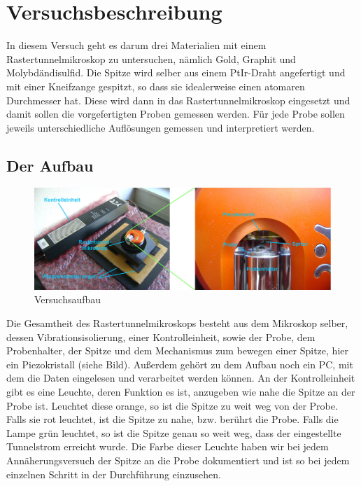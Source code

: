 \section{Versuchsbeschreibung}

In diesem Versuch geht es darum drei Materialien mit einem Rastertunnelmikroskop zu untersuchen, nämlich Gold, Graphit und Molybdändisulfid. Die Spitze wird selber aus einem PtIr-Draht angefertigt und mit einer Kneifzange gespitzt, so dass sie idealerweise einen atomaren Durchmesser hat. Diese wird dann in das Rastertunnelmikroskop eingesetzt und damit sollen die vorgefertigten Proben gemessen werden. Für  jede Probe sollen jeweils unterschiedliche Auflösungen gemessen und interpretiert werden.

\subsection{Der Aufbau}

\begin{figure}[H]
	\centering \includegraphics[width=\textwidth]{Bilder/aufbau.jpg}
	\caption{Versuchsaufbau}
\end{figure}

Die Gesamtheit des Rastertunnelmikroskops besteht aus dem Mikroskop selber, dessen Vibrationsisolierung, einer Kontrolleinheit, sowie der Probe, dem Probenhalter, der Spitze und dem Mechanismus zum bewegen einer Spitze, hier ein Piezokristall (siehe Bild). Außerdem gehört zu dem Aufbau noch ein PC, mit dem die Daten eingelesen und verarbeitet werden können. 
An der Kontrolleinheit gibt es eine Leuchte, deren Funktion es ist, anzugeben wie nahe die Spitze an der Probe ist. Leuchtet diese orange, so ist die Spitze zu weit weg von der Probe. Falls sie rot leuchtet, ist die Spitze zu nahe, bzw. berührt die Probe. Falls die Lampe grün leuchtet, so ist die Spitze genau so weit weg, dass der eingestellte Tunnelstrom erreicht wurde. Die Farbe dieser Leuchte haben wir bei jedem Annäherungsversuch der Spitze an die Probe dokumentiert und ist so bei jedem einzelnen Schritt in der Durchführung einzusehen.

\clearpage